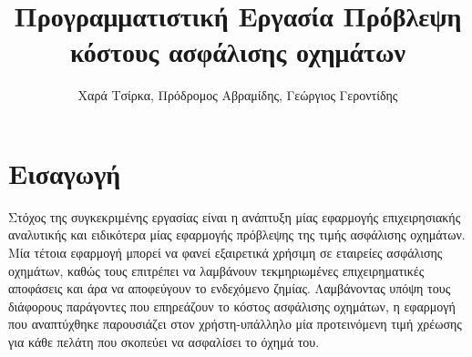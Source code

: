 \documentclass{llncs}
\begin{document}
%
\title{\Huge Προγραμματιστική Εργασία Πρόβλεψη κόστους ασφάλισης οχημάτων}
%
%
\author{\Large Χαρά Τσίρκα, Πρόδρομος Αβραμίδης, Γεώργιος Γεροντίδης}
%
%
%

\maketitle


\section{Εισαγωγή}
Στόχος της συγκεκριμένης εργασίας είναι η ανάπτυξη μίας εφαρμογής επιχειρησιακής αναλυτικής και ειδικότερα μίας εφαρμογής πρόβλεψης της τιμής ασφάλισης οχημάτων. Μία τέτοια εφαρμογή μπορεί να 
φανεί εξαιρετικά χρήσιμη σε εταιρείες ασφάλισης οχημάτων, καθώς τους επιτρέπει να λαμβάνουν τεκμηριωμένες επιχειρηματικές αποφάσεις και άρα να αποφεύγουν το ενδεχόμενο ζημίας. Λαμβάνοντας υπόψη 
τους διάφορους παράγοντες που επηρεάζουν το κόστος ασφάλισης οχημάτων, η εφαρμογή που αναπτύχθηκε παρουσιάζει στον χρήστη-υπάλληλο μία προτεινόμενη τιμή χρέωσης για κάθε πελάτη που σκοπεύει να ασφαλίσει το όχημά του.
\end{document}
